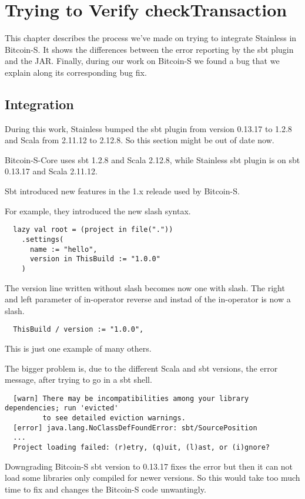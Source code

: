 \chapter{Trying to Verify checkTransaction}
\label{chap:connecting}
This chapter describes the process we've made on trying to integrate Stainless in Bitcoin-S.
It shows the differences between the error reporting by the sbt plugin and the JAR.
Finally, during our work on Bitcoin-S we found a bug that we explain along its corresponding bug fix.

\section{Integration}
During this work, Stainless bumped the sbt plugin from version 0.13.17 to 1.2.8 and Scala from 2.11.12 to 2.12.8.
So this section might be out of date now.

Bitcoin-S-Core uses sbt 1.2.8 and Scala 2.12.8, while Stainless sbt plugin is on sbt 0.13.17 and Scala 2.11.12.

Sbt introduced new features in the 1.x releade used by Bitcoin-S.

For example, they introduced the new slash syntax.
\begin{lstlisting}
  lazy val root = (project in file("."))
    .settings(
      name := "hello",
      version in ThisBuild := "1.0.0"
    )
\end{lstlisting}
The version line written without slash becomes now one with slash.
The right and left parameter of in-operator reverse and instad of the in-operator is now a slash.
\begin{lstlisting}
  ThisBuild / version := "1.0.0",
\end{lstlisting}
This is just one example of many others.

The bigger problem is, due to the different Scala and sbt versions, the error message, after trying to go in a sbt shell.
\begin{lstlisting}
  [warn] There may be incompatibilities among your library dependencies; run 'evicted'
         to see detailed eviction warnings.
  [error] java.lang.NoClassDefFoundError: sbt/SourcePosition
  ...
  Project loading failed: (r)etry, (q)uit, (l)ast, or (i)gnore?
\end{lstlisting}
Downgrading Bitcoin-S sbt version to 0.13.17 fixes the error but then it can not load some libraries only compiled for newer versions.
So this would take too much time to fix and changes the Bitcoin-S code unwantingly.

